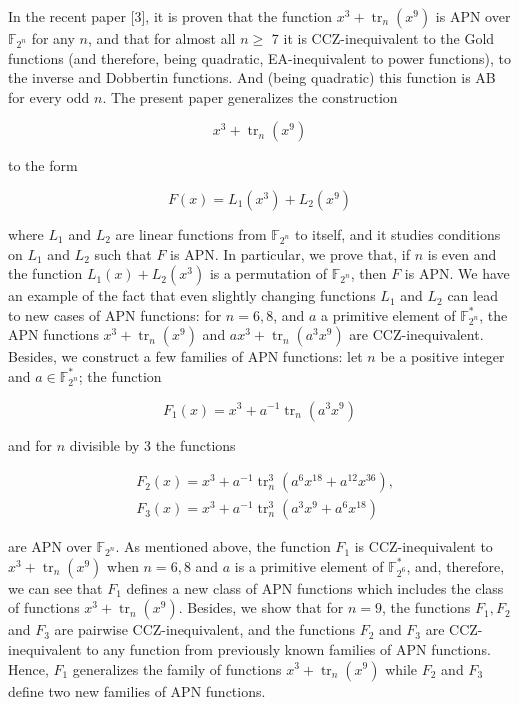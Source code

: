 \documentclass[10pt]{article}
\begin{document}
In the recent paper [3], it is proven that the function $x^{3}+ \operatorname{tr}_{n}\left(x^{9}\right)$ is APN over $\mathbb{F}_{2^{n}}$ for any $n$, and that for almost all $n \geq$ 7 it is CCZ-inequivalent to the Gold functions (and therefore, being quadratic, EA-inequivalent to power functions), to the inverse and Dobbertin functions. And (being quadratic) this function is AB for every odd $n$. The present paper generalizes the construction

$$
x^{3}+\operatorname{tr}_{n}\left(x^{9}\right)
$$

to the form

$$
F(x)=L_{1}\left(x^{3}\right)+L_{2}\left(x^{9}\right)
$$

where $L_{1}$ and $L_{2}$ are linear functions from $\mathbb{F}_{2^{n}}$ to itself, and it studies conditions on $L_{1}$ and $L_{2}$ such that $F$ is APN. In particular, we prove that, if $n$ is even and the function $L_{1}(x)+ L_{2}\left(x^{3}\right)$ is a permutation of $\mathbb{F}_{2^{n}}$, then $F$ is APN. We have an example of the fact that even slightly changing functions $L_{1}$ and $L_{2}$ can lead to new cases of APN functions: for $n=6,8$, and $a$ a primitive element of $\mathbb{F}_{2^{n}}^{*}$, the APN functions $x^{3}+ \operatorname{tr}_{n}\left(x^{9}\right)$ and $a x^{3}+\operatorname{tr}_{n}\left(a^{3} x^{9}\right)$ are CCZ-inequivalent. Besides, we construct a few families of APN functions: let $n$ be a positive integer and $a \in \mathbb{F}_{2^{n}}^{*}$; the function

$$
F_{1}(x)=x^{3}+a^{-1} \operatorname{tr}_{n}\left(a^{3} x^{9}\right)
$$

and for $n$ divisible by 3 the functions

$$
\begin{aligned}
& F_{2}(x)=x^{3}+a^{-1} \operatorname{tr}_{n}^{3}\left(a^{6} x^{18}+a^{12} x^{36}\right), \\
& F_{3}(x)=x^{3}+a^{-1} \operatorname{tr}_{n}^{3}\left(a^{3} x^{9}+a^{6} x^{18}\right)
\end{aligned}
$$

are APN over $\mathbb{F}_{2^{n}}$. As mentioned above, the function $F_{1}$ is CCZ-inequivalent to $x^{3}+\operatorname{tr}_{n}\left(x^{9}\right)$ when $n=6,8$ and $a$ is a primitive element of $\mathbb{F}_{2^{6}}^{*}$, and, therefore, we can see that $F_{1}$ defines a new class of APN functions which includes the class of functions $x^{3}+\operatorname{tr}_{n}\left(x^{9}\right)$. Besides, we show that for $n=9$, the functions $F_{1}, F_{2}$ and $F_{3}$ are pairwise CCZ-inequivalent, and the functions $F_{2}$ and $F_{3}$ are CCZ-inequivalent to any function from previously known families of APN functions. Hence, $F_{1}$ generalizes the family of functions $x^{3}+\operatorname{tr}_{n}\left(x^{9}\right)$ while $F_{2}$ and $F_{3}$ define two new families of APN functions.
\end{document}
